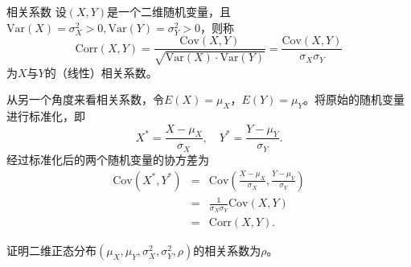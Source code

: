 \begin{definition}{相关系数} \label{def:corr}
设$(X,Y)$是一个二维随机变量，且$\text{Var}(X)=\sigma _{X} ^{2} >0, \text{Var}(Y)=\sigma _{Y} ^{2} >0$，则称$$
\text{Corr}(X, Y)=\frac{\text{Cov}(X, Y)}{\sqrt{\text{Var}(X) \cdot \text{Var}(Y)}}=\frac{\text{Cov}(X, Y)}{\sigma_{X} \sigma_{Y}}$$为$X$与$Y$的（线性）相关系数。
\end{definition}
\begin{remark}
    从另一个角度来看相关系数，令$E(X) = \mu_X$，$E(Y) = \mu_Y$。将原始的随机变量进行标准化，即
    $$
    X^{\ast} = \frac{X-\mu_{X}}{\sigma_{X}} , \quad Y^{\ast} = \frac{Y-\mu_{Y}}{\sigma_{Y}}. 
    $$
    经过标准化后的两个随机变量的协方差为
    \begin{eqnarray*}
        \text{Cov}(X^{\ast},Y^{\ast}) &=& \text{Cov}\left(\frac{X-\mu_{X}}{\sigma_{X}}, \frac{Y-\mu_{Y}}{\sigma_{Y}}\right)\\
        &=& \frac{1}{\sigma_X\sigma_Y} \text{Cov}(X,Y)\\
        &=& \text{Corr}(X,Y).
    \end{eqnarray*}
\end{remark}
\begin{example}
    证明二维正态分布$\left(\mu_{X}, \mu_{Y}, \sigma_{X}^{2}, \sigma_{Y}^{2}, \rho\right)$的相关系数为$\rho$。
\end{example}
